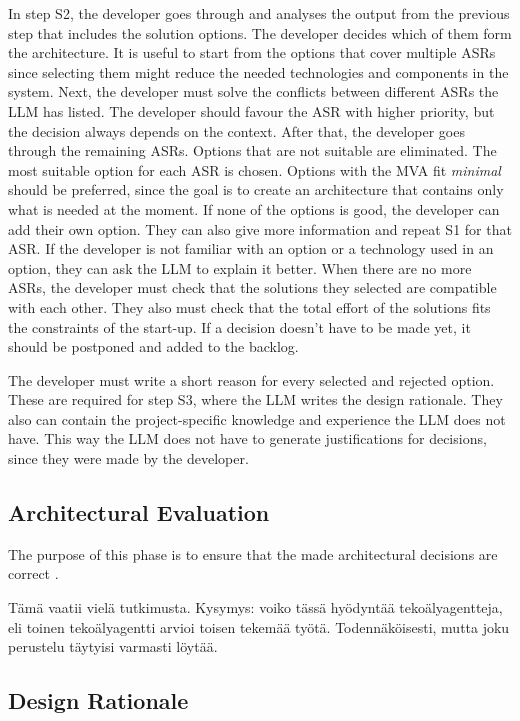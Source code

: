 In step S2, the developer goes through and analyses the output from the previous step that includes the solution options. The developer decides which of them form the architecture. It is useful to start from the options that cover multiple ASRs since selecting them might reduce the needed technologies and components in the system. Next, the developer must solve the conflicts between different ASRs the LLM has listed. The developer should favour the ASR with higher priority, but the decision always depends on the context. After that, the developer goes through the remaining ASRs. Options that are not suitable are eliminated. The most suitable option for each ASR is chosen. Options with the MVA fit \emph{minimal} should be preferred, since the goal is to create an architecture that contains only what is needed at the moment. If none of the options is good, the developer can add their own option. They can also give more information and repeat S1 for that ASR. If the developer is not familiar with an option or a technology used in an option, they can ask the LLM to explain it better. When there are no more ASRs, the developer must check that the solutions they selected are compatible with each other. They also must check that the total effort of the solutions fits the constraints of the start-up. If a decision doesn't have to be made yet, it should be postponed and added to the backlog. 

The developer must write a short reason for every selected and rejected option. These are required for step S3, where the LLM writes the design rationale. They also can contain the project-specific knowledge and experience the LLM does not have. This way the LLM does not have to generate justifications for decisions, since they were made by the developer.

\subsection{Architectural Evaluation}
\label{sec:architectural_evaluation}

The purpose of this phase is to ensure that the made architectural decisions are correct \parencite{hofmeisterGeneralModelSoftware2007}.

Tämä vaatii vielä tutkimusta. Kysymys: voiko tässä hyödyntää tekoälyagentteja, eli toinen tekoälyagentti arvioi toisen tekemää työtä. Todennäköisesti, mutta joku perustelu täytyisi varmasti löytää.

\subsection{Design Rationale}
\label{sec:design_rationale}

